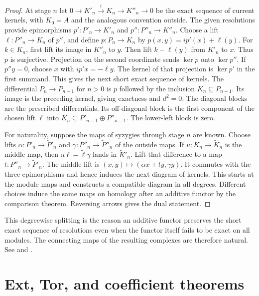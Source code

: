 \documentclass[11pt,oneside,openany]{book}
\theoremstyle{definition}
\theoremstyle{remark}
\begin{document}
\begin{proof}
At stage \(n\) let \(0\to K'_n\xrightarrow{i}K_n\to K''_n\to0\)
be the exact sequence of current kernels, with \(K_0=A\) and
the analogous convention outside. The given resolutions
provide epimorphisms \(p':P'_n\to K'_n\) and \(p'':P''_n\to K''_n\).
Choose a lift \(\ell:P''_n\to K_n\) of \(p''\), and define
\(p:P_n\to K_n\) by \(p(x,y)=i p'(x)+\ell(y)\).
For \(k\in K_n\), first lift its image in \(K''_n\) to \(y\).
Then lift \(k-\ell(y)\) from \(K'_n\) to \(x\).
Thus \(p\) is surjective. Projection on the second coordinate
sends \(\ker p\) onto \(\ker p''\). If \(p'' y=0\), choose
\(x\) with \(i p' x=-\ell y\). The kernel of that projection is
\(\ker p'\) in the first summand. This gives the next short exact
sequence of kernels. The differential \(P_n\to P_{n-1}\) for
\(n>0\) is \(p\) followed by the inclusion \(K_n\subseteq P_{n-1}\).
Its image is the preceding kernel, giving exactness and \(d^2=0\).
The diagonal blocks are the prescribed differentials. Its
off-diagonal block is the first component of the chosen lift
\(\ell\) into \(K_n\subseteq P'_{n-1}\oplus P''_{n-1}\).
The lower-left block is zero.

For naturality, suppose the maps of syzygies through stage \(n\)
are known. Choose lifts \(\alpha:P'_n\to\widetilde P'_n\) and
\(\gamma:P''_n\to\widetilde P''_n\) of the outside maps.
If \(u:K_n\to\widetilde K_n\) is the middle map, then
\(u\ell-\widetilde\ell\gamma\) lands in
\(\widetilde K'_n\). Lift that difference to a map
\(t:P''_n\to\widetilde P'_n\). The middle lift is
\((x,y)\mapsto(\alpha x+t y,\gamma y)\).
It commutes with the three epimorphisms and hence induces the
next diagram of kernels. This starts at the module maps and
constructs a compatible diagram in all degrees. Different choices
induce the same maps on homology after an additive functor by
the comparison theorem. Reversing arrows gives the dual statement.
\end{proof}

This degreewise splitting is the reason an additive functor
preserves the short exact sequence of resolutions even when the
functor itself fails to be exact on all modules. The connecting
maps of the resulting complexes are therefore natural. See
\cite[Horseshoe Lemma 2.2.8]{weibel} and
\cite[Proposition 6.24 and Theorem 6.27]{rotman}.
\chapter{Ext, Tor, and coefficient theorems}
\label{p103:ch11}
\end{document}
